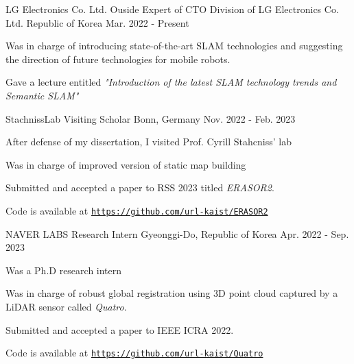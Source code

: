 

\begin{cventries}

  \cventry
    {LG Electronics Co. Ltd.} %
    {Ouside Expert of CTO Division of LG Electronics Co. Ltd.} %
    {Republic of Korea} %
    {Mar. 2022 - Present} %
    {
      \begin{cvitems} %
        \item Was in charge of introducing state-of-the-art SLAM technologies and suggesting the direction of future technologies for mobile robots.
        \item Gave a lecture entitled \textit{"Introduction of the latest SLAM technology trends and Semantic SLAM"}
      \end{cvitems}
    }

  \cventry
    {StachnissLab} %
    {Visiting Scholar} %
    {Bonn, Germany} %
    {Nov. 2022 - Feb. 2023} %
    {
      \begin{cvitems} %
        \item After defense of my dissertation, I visited Prof. Cyrill Stahcniss' lab
        \item Was in charge of improved version of static map building
        \item Submitted and accepted a paper to RSS 2023 titled \textit{ERASOR2}.
        \item Code is available at \href{https://github.com/url-kaist/ERASOR2}{\texttt{https://github.com/url-kaist/ERASOR2}}
      \end{cvitems}
    }

  \cventry
    {NAVER LABS} %
    {Research Intern} %
    {Gyeonggi-Do, Republic of Korea} %
    {Apr. 2022 - Sep. 2023} %
    {
      \begin{cvitems} %
        \item Was a Ph.D research intern
        \item Was in charge of robust global registration using 3D point cloud captured by a LiDAR sensor called \textit{Quatro}.
        \item Submitted and accepted a paper to IEEE ICRA 2022.
        \item Code is available at \href{https://github.com/url-kaist/Quatro}{\texttt{https://github.com/url-kaist/Quatro}}
      \end{cvitems}
    }
\end{cventries}
